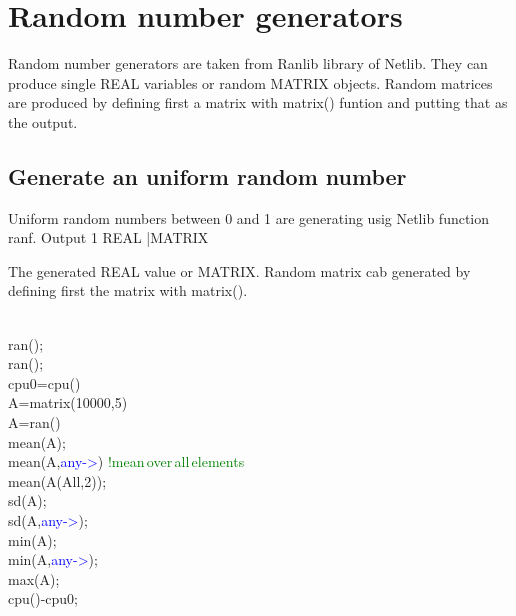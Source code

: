 \section{Random number generators}
\label{randomgen}
Random number generators are taken from Ranlib library of Netlib.
They can produce single REAL variables or random MATRIX objects.
Random matrices are produced by defining first a matrix with \textcolor{VioletRed}{matrix}()
funtion and putting that as the output.
\subsection{Generate an uniform random number}
\label{ran}
Uniform random numbers between 0 and 1 are generating usig Netlib function ranf.
\vspace{0.3cm}
\hline
\vspace{0.3cm}
\noindent Output \tabto{3cm}  1 \tabto{5cm}   REAL |MATRIX   \tabto{7cm}
\begin{changemargin}{3cm}{0cm}
\noindent  The generated REAL value or MATRIX.
Random matrix cab generated by defining first the matrix with \textcolor{VioletRed}{matrix}().
\end {changemargin}
\hline
\vspace{0.2cm}
\begin{example}[ranex]\\
\label{ranex}
\textcolor{VioletRed}{ran}();\\
\textcolor{VioletRed}{ran}();\\
cpu0=cpu()\\
A=\textcolor{VioletRed}{matrix}(10000,5)\\
A=\textcolor{VioletRed}{ran}()\\
\textcolor{VioletRed}{mean}(A);\\
\textcolor{VioletRed}{mean}(A,\textcolor{blue}{any->}) \textcolor{green}{!mean\,over\,all\,elements}\\
\textcolor{VioletRed}{mean}(A(All,2));\\
\textcolor{VioletRed}{sd}(A);\\
\textcolor{VioletRed}{sd}(A,\textcolor{blue}{any->});\\
\textcolor{VioletRed}{min}(A);\\
\textcolor{VioletRed}{min}(A,\textcolor{blue}{any->});\\
\textcolor{VioletRed}{max}(A);\\
cpu()-cpu0;
\end{example}
